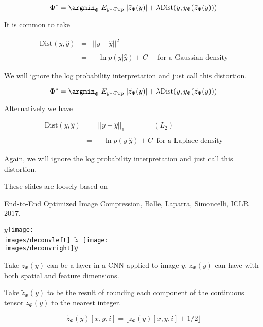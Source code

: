 {$$\Phi^* = \argmin_\Phi\;E_{y \sim \mathrm{Pop}}\;|\tilde{z}_\Phi(y)| + \lambda \mathrm{Dist}(y,y_\Phi(\tilde{z}_\Phi(y)))$$

\vfill
It is common to take

\begin{eqnarray*}
\mathrm{Dist}(y,\hat{y}) & = & ||y-\hat{y}||^2 \\
\\
& = & -\ln p(y|\hat{y}) + C \;\;\;\;\;\mbox{for a Gaussian density}
\end{eqnarray*}

\vfill
We will ignore the log probability interpretation and just call this distortion.


$$\Phi^* = \argmin_\Phi\;E_{y \sim \mathrm{Pop}}\;|\tilde{z}_\Phi(y)| + \lambda \mathrm{Dist}(y,y_\Phi(\tilde{z}_\Phi(y)))$$

Alternatively we have

\begin{eqnarray*}
\mathrm{Dist}(y,\hat{y}) & = & ||y-\hat{y}||_1 \hspace{4em}(L_2) \\
\\
& = & -\ln p(y|\hat{y}) + C \;\;\mbox{for a Laplace density}
\end{eqnarray*}

\vfill
Again, we will ignore the log probability interpretation and just call this distortion.

These slides are loosely based on

\vfill
End-to-End Optimized Image Compression, Balle, Laparra, Simoncelli, ICLR 2017.


\vfill
\centerline{$y$\texttt{[image: \\images/deconvleft]} $\;\tilde{z}\;$ \texttt{[image: \\images/deconvright]}$\hat{y}$}



Take $z_\Phi(y)$ can be a layer in a CNN applied to image $y$.  $z_\Phi(y)$ can have with both spatial and feature dimensions.

\vfill
Take $\tilde{z}_\Phi(y)$ to be the result of rounding each component of the continuous tensor $z_\Phi(y)$ to the nearest integer.

\vfill
$$\tilde{z}_\Phi(y)[x,y,i] = \lfloor z_\Phi(y)[x,y,i] + 1/2 \rfloor$$


}
